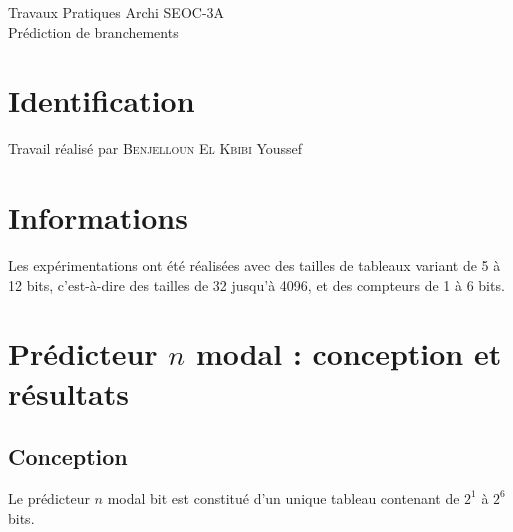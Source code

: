 \documentclass[a4paper]{article}
\begin{document}
\begin{center}
\large
Travaux Pratiques Archi SEOC-3A\\
\LARGE
Prédiction de branchements\\
\large

\end{center}

\tableofcontents


\section{Identification}
Travail réalisé par \textsc{Benjelloun El Kbibi} Youssef

\section{Informations}
Les expérimentations ont été réalisées avec des tailles de tableaux variant de 5 à 12 bits, c'est-à-dire des tailles de 32 jusqu'à 4096, et des compteurs de 1 à 6 bits.

\section{Prédicteur $n$ modal : conception et résultats}
\subsection{Conception}
Le prédicteur $n$ modal bit est constitué d'un unique tableau contenant de $2^1$ à $2^6$ bits.
\end{document}
